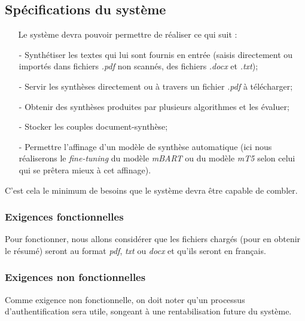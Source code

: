 \subsection{Spécifications du système}
$ _{} $ $ _{} $ $ _{} $ $ _{} $ $ _{} $Le système devra pouvoir permettre de réaliser ce qui suit :
\begin{itemize}
\item[-] Synthétiser les textes qui lui sont fournis en entrée (saisis directement ou importés dans fichiers \textit{.pdf} non scannés, des fichiers \textit{.docx} et \textit{.txt});
\item[-] Servir les synthèses directement ou à travers un fichier \textit{.pdf} à télécharger;
\item[-] Obtenir des synthèses produites par plusieurs algorithmes et les évaluer;
\item[-] Stocker les couples document-synthèse;
\item[-] Permettre l'affinage d'un modèle de synthèse automatique (ici nous réaliserons le \textit{fine-tuning} du modèle \textit{mBART} ou du modèle \textit{mT5} selon celui qui se prêtera mieux à cet affinage).
\end{itemize}
C'est cela le minimum de besoins que le système devra être capable de combler.
\subsubsection{Exigences fonctionnelles}
Pour fonctionner, nous allons considérer que les fichiers chargés (pour en obtenir le résumé) seront au format \textit{pdf}, \textit{txt} ou \textit{docx} et qu'ils seront en français.
\subsubsection{Exigences non fonctionnelles}
Comme exigence non fonctionnelle, on doit noter qu'un processus d'authentification sera utile, songeant à une rentabilisation future du système.
